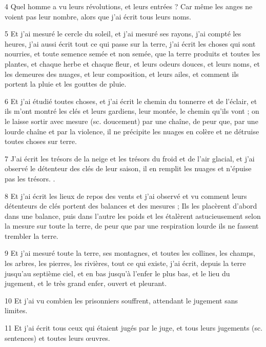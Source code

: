 \par 4 Quel homme a vu leurs révolutions, et leurs entrées ? Car même les anges ne voient pas leur nombre, alors que j'ai écrit tous leurs noms.

\par 5 Et j'ai mesuré le cercle du soleil, et j'ai mesuré ses rayons, j'ai compté les heures, j'ai aussi écrit tout ce qui passe sur la terre, j'ai écrit les choses qui sont nourries, et toute semence semée et non semée, que la terre produits et toutes les plantes, et chaque herbe et chaque fleur, et leurs odeurs douces, et leurs noms, et les demeures des nuages, et leur composition, et leurs ailes, et comment ils portent la pluie et les gouttes de pluie.

\par 6 Et j'ai étudié toutes choses, et j'ai écrit le chemin du tonnerre et de l'éclair, et ils m'ont montré les clés et leurs gardiens, leur montée, le chemin qu'ils vont ; on le laisse sortir avec mesure (sc. doucement) par une chaîne, de peur que, par une lourde chaîne et par la violence, il ne précipite les nuages ​​​​en colère et ne détruise toutes choses sur terre.

\par 7 J'ai écrit les trésors de la neige et les trésors du froid et de l'air glacial, et j'ai observé le détenteur des clés de leur saison, il en remplit les nuages ​​et n'épuise pas les trésors. .

\par 8 Et j'ai écrit les lieux de repos des vents et j'ai observé et vu comment leurs détenteurs de clés portent des balances et des mesures ; Ils les placèrent d'abord dans une balance, puis dans l'autre les poids et les étalèrent astucieusement selon la mesure sur toute la terre, de peur que par une respiration lourde ils ne fassent trembler la terre.

\par 9 Et j'ai mesuré toute la terre, ses montagnes, et toutes les collines, les champs, les arbres, les pierres, les rivières, tout ce qui existe, j'ai écrit, depuis la terre jusqu'au septième ciel, et en bas jusqu'à l'enfer le plus bas, et le lieu du jugement, et le très grand enfer, ouvert et pleurant.

\par 10 Et j'ai vu combien les prisonniers souffrent, attendant le jugement sans limites.

\par 11 Et j'ai écrit tous ceux qui étaient jugés par le juge, et tous leurs jugements (sc. sentences) et toutes leurs œuvres.

